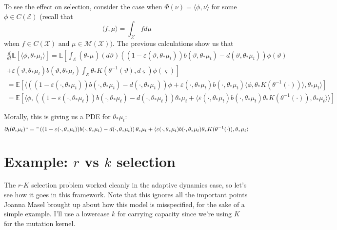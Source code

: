 \documentclass[11pt]{amsart}
\theoremstyle{remark}
\theoremstyle{definition}
\begin{document}
To see the effect on selection, consider the case when $\Phi(\nu) = \langle \phi, \nu \rangle$ for some $\phi \in C(\mathcal{E})$ (recall that
\[
	\langle f, \mu \rangle = \int_{\mathcal{X}} f d\mu
\]
when $f \in C(\mathcal{X})$ and $\mu \in \mathcal{M}(\mathcal{X}))$.  The previous calculations show us that 
\begin{multline*}
	\frac{d}{dt} \mathbb{E}[\langle \phi, \theta_{*}\mu_{t} \rangle] 
	= \mathbb{E}\left[\int_{\mathcal{E}} (\theta_{*}\mu_{})(d\vartheta) 
	\left((1-\varepsilon(\vartheta,\theta_{*}\mu_{t})) b(\vartheta,\theta_{*}\mu_{t})- d(\vartheta,\theta_{*}\mu_{t})\right)\phi(\vartheta)\right.\\
	\left.+ \varepsilon(\vartheta,\theta_{*}\mu_{t}) b(\vartheta,\theta_{*}\mu_{t})
		\int_{\mathcal{E}} \theta_{*}K(\theta^{-1}(\vartheta),d\varsigma)\phi(\varsigma)\right]\\
	= \mathbb{E}\left[\langle \left((1-\varepsilon(\cdot,\theta_{*}\mu_{t})) b(\cdot,\theta_{*}\mu_{t})
		- d(\cdot,\theta_{*}\mu_{t})\right)\phi 
		+ \varepsilon(\cdot,\theta_{*}\mu_{t}) b(\cdot,\theta_{*}\mu_{t})\langle \phi, \theta_{*}K(\theta^{-1}(\cdot)) \rangle, \theta_{*}\mu_{t} \rangle 
		\right] \\
	= \mathbb{E}\left[\langle \phi, \left((1-\varepsilon(\cdot,\theta_{*}\mu_{t})) b(\cdot,\theta_{*}\mu_{t})
		- d(\cdot,\theta_{*}\mu_{t}) \right) \theta_{*}\mu_{t}
		+ \langle  \varepsilon(\cdot,\theta_{*}\mu_{t}) b(\cdot,\theta_{*}\mu_{t}) \theta_{*}K(\theta^{-1}(\cdot)),\theta_{*}\mu_{t}\rangle \rangle\right]
\end{multline*}

Morally, this is giving us a PDE for $\theta_{*}\mu_{t}$:
\[
	\partial_{t} (\theta_{*}\mu_{t}) ``=\text{''} \left((1-\varepsilon(\cdot,\theta_{*}\mu_{t})) b(\cdot,\theta_{*}\mu_{t})
		- d(\cdot,\theta_{*}\mu_{t}) \right) \theta_{*}\mu_{t}
		+ \langle  \varepsilon(\cdot,\theta_{*}\mu_{t}) b(\cdot,\theta_{*}\mu_{t}) \theta_{*}K(\theta^{-1}(\cdot)),\theta_{*}\mu_{t}\rangle
\]

\section*{Example: $r$ vs $k$ selection}

The $r$-$K$ selection problem worked cleanly in the adaptive dynamics
case, so let's see how it goes in this framework.
Note that this ignores all the important points Joanna Masel brought up
about how this model is misspecified,
for the sake of a simple example.
I'll use a lowercase $k$ for carrying capacity since we're using $K$ for
the mutation kernel.
\end{document}
